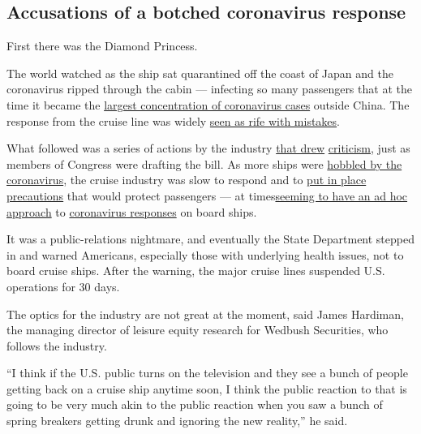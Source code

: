 \hypertarget{accusations-of-a-botched-coronavirus-response}{%
\subsection{Accusations of a botched coronavirus
response}\label{accusations-of-a-botched-coronavirus-response}}

First there was the Diamond Princess.

The world watched as the ship sat quarantined off the coast of Japan and
the coronavirus ripped through the cabin --- infecting so many
passengers that at the time it became the
\href{https://www.nytimes3xbfgragh.onion/2020/02/22/world/asia/coronavirus-japan-cruise-ship.html}{largest
concentration of coronavirus cases} outside China. The response from the
cruise line was widely
\href{https://www.nytimes3xbfgragh.onion/2020/03/08/world/asia/coronavirus-cruise-ship.html}{seen
as rife with mistakes}.

What followed was a series of actions by the industry
\href{https://skift.com/2020/03/10/nothing-could-stop-the-cruise-industry-then-came-coronavirus/}{that
drew}
\href{https://www.wsj.com/articles/coronavirus-cruise-quarantine-draws-criticism-after-more-passengers-infected-11582039428}{criticism},
just as members of Congress were drafting the bill. As more ships were
\href{https://www.nytimes3xbfgragh.onion/2020/03/06/us/california-coronavirus-cruise-ship.html}{hobbled
by the coronavirus}, the cruise industry was slow to respond and to
\href{https://www.businessinsider.com/how-diamond-princess-cruise-ship-coronavirus-quarantine-went-wrong-2020-2}{put
in place precautions} that would protect passengers --- at
times\href{https://www.nytimes3xbfgragh.onion/2020/03/19/travel/coronavirus-cruise-costa-luminosa.html}{seeming
to have an ad hoc approach} to
\href{https://www.nytimes3xbfgragh.onion/2020/03/05/us/cruise-ship-california.html}{coronavirus
responses} on board ships.

It was a public-relations nightmare, and eventually the State Department
stepped in and warned Americans, especially those with underlying health
issues, not to board cruise ships. After the warning, the major cruise
lines suspended U.S. operations for 30 days.

The optics for the industry are not great at the moment, said James
Hardiman, the managing director of leisure equity research for Wedbush
Securities, who follows the industry.

``I think if the U.S. public turns on the television and they see a
bunch of people getting back on a cruise ship anytime soon, I think the
public reaction to that is going to be very much akin to the public
reaction when you saw a bunch of spring breakers getting drunk and
ignoring the new reality,'' he said.

